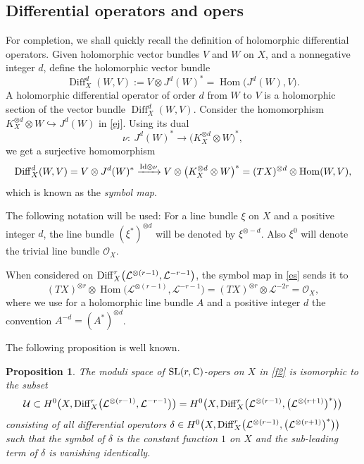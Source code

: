 \documentclass[pdftex]{sigma}
\numberwithin{equation}{section}
\newtheorem{Proposition}[Theorem]{Proposition}
 { \theoremstyle{definition}
\newtheorem{Definition}[Theorem]{Definition}
\newtheorem{Note}[Theorem]{Note}
\newtheorem{Example}[Theorem]{Example}
\newtheorem{Remark}[Theorem]{Remark} }
\begin{document}
\subsection{Differential operators and opers}

For completion, we shall quickly recall the definition of holomorphic differential operators. Given holomorphic
vector bundles $V$ and $W$ on $X$, and a nonnegative integer $d$, define the holomorphic vector bundle
\[
\operatorname{Diff}^d_X(W, V) := V\otimes J^d(W)^* = \operatorname{Hom}\bigl(J^d(W), V\bigr).
\]
A holomorphic differential operator of order $d$ from $W$ to $V$ is a holomorphic
section of the vector bundle $\operatorname{Diff}^d_X(W, V)$.
Consider the homomorphism $K^{\otimes d}_X\otimes W \hookrightarrow J^d(W)$
in \eqref{ej}. Using its dual%
\[
\nu\colon\ J^d(W)^* \longrightarrow \bigl(K^{\otimes d}_X\otimes W\bigr)^*,
\]
we get a surjective homomorphism
\begin{equation}\label{es}
\operatorname{Diff}^d_X(W, V) = V\otimes J^d(W)^*
 \xrightarrow{ {\rm Id}\otimes\nu } V\otimes \bigl(K^{\otimes d}_X\otimes W\bigr)^*
 = (TX)^{\otimes d}\otimes \operatorname{Hom}(W, V),
\end{equation}
which is known as the {\it symbol map}.

The following notation will be used: For a line bundle $\xi$ on $X$ and a positive integer $d$, the line bundle
$(\xi^*)^{\otimes d}$ will be denoted by $\xi^{\otimes -d}$. Also $\xi^0$ will denote the trivial line bundle
${\mathcal O}_X$.

When considered on
${\rm Diff}^r_X\bigl({\mathcal L}^{\otimes (r-1)},
{\mathcal L}^{-r-1}\bigr)$, the symbol map in \eqref{es} sends it to
\[
(TX)^{\otimes r}\otimes \operatorname{Hom}\bigl({\mathcal L}^{\otimes (r-1)}, {\mathcal L}^{-r-1}\bigr)
 = (TX)^{\otimes r}\otimes {\mathcal L}^{-2r} = {\mathcal O}_X,
\]
where we use for a holomorphic line bundle $A$ and a positive integer $d$ the convention ${A^{-d}\!\!=\!(\!A^*\!)^{\otimes d}}$\!.

The following proposition is well known.

\begin{Proposition}\label{f3}
The moduli space of ${\rm SL}(r, {\mathbb C})$-opers on $X$ in \eqref{f2} is isomorphic to the subset
\begin{gather}
\mathcal U \subset H^0\bigl(X, {\rm Diff}^r_X\bigl({\mathcal L}^{\otimes (r-1)},
{\mathcal L}^{-r-1}\bigr)\bigr) = H^0\bigl(X,
{\rm Diff}^r_X\bigl({\mathcal L}^{\otimes (r-1)}, \bigl({\mathcal L}^{\otimes (r+1)}\bigr)^*\bigr)\bigr)\nonumber
\end{gather}
consisting of all differential operators $\delta \in H^0\bigl(X, {\rm Diff}^r_X\bigl({\mathcal
L}^{\otimes (r-1)}, \bigl({\mathcal L}^{\otimes (r+1)}\bigr)^*\bigr)\bigr)$ such that the symbol of $\delta$
is the constant function $1$ on $X$ and the sub-leading term of $\delta$ is vanishing
identically.
\end{Proposition}
\end{document}
